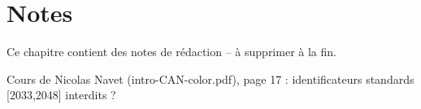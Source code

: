 

\chapter{Notes}

\thispagestyle{empty}

Ce chapitre contient des notes de rédaction -- à supprimer à la fin. \pasFini

Cours de Nicolas Navet (intro-CAN-color.pdf), page 17 : identificateurs standards [2033,2048] interdits ?
